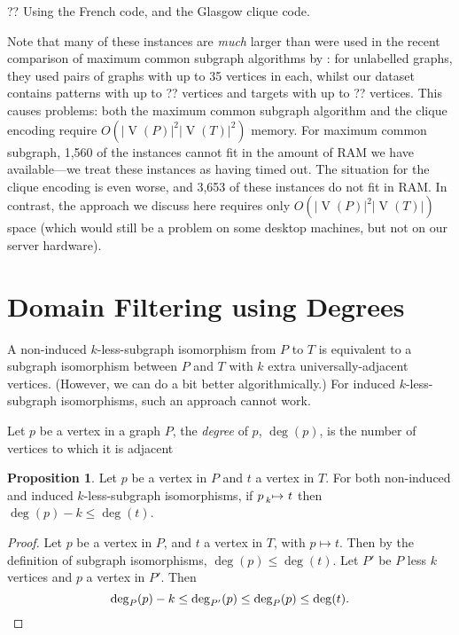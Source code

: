 \documentclass[letterpaper]{article}
\newcommand{\citet}[1]{\citeauthor{#1} \shortcite{#1}}
\theoremstyle{definition}
\newtheorem{proposition}{Proposition}
\newcommand{\lessmap}[1]{\prescript{}{#1}{\mapsto}\ }
\newcommand{\V}{\operatorname{V}}
\begin{document}
?? Using the French code, and the Glasgow clique code.

Note that many of these instances are \emph{much} larger than were used in the recent comparison of
maximum common subgraph algorithms by \citet{DBLP:conf/cp/McCreeshNPS16}: for unlabelled graphs,
they used pairs of graphs with up to 35 vertices in each, whilst our dataset contains patterns with
up to ?? vertices and targets with up to ?? vertices. This causes problems: both the maximum common
subgraph algorithm and the clique encoding require $O(\left|\V(P)\right|^2\left|\V(T)\right|^2)$
memory. For maximum common subgraph, 1,560 of the instances cannot fit in the amount of RAM we have
available---we treat these instances as having timed out. The situation for the clique encoding is
even worse, and 3,653 of these instances do not fit in RAM. In contrast, the approach we discuss
here requires only $O(\left|\V(P)\right|^2\left|\V(T)\right|)$ space (which would still be a problem
on some desktop machines, but not on our server hardware).

\section{Domain Filtering using Degrees}\label{section:degreefiltering}

A non-induced $k$-less-subgraph isomorphism from $P$ to $T$ is equivalent to a subgraph
isomorphism between $P$ and $T$ with $k$ extra universally-adjacent vertices. (However, we can do a
bit better algorithmically.) For induced $k$-less-subgraph isomorphisms, such an approach cannot
work.

Let $p$ be a vertex in a graph $P$, the \emph{degree} of $p$, $\deg(p)$, is the number of vertices
to which it is adjacent

\begin{proposition}
    \label{prop:deg}
    Let $p$ be a vertex in $P$ and $t$ a vertex in $T$. For both non-induced and induced
    $k$-less-subgraph isomorphisms, if $p \lessmap{k} t$ then
    $\deg(p) - k \le \deg(t)$.
\end{proposition}
\begin{proof}
Let $p$ be a vertex in $P$, and $t$ a vertex in $T$, with $p\mapsto t$. Then by the definition of subgraph isomorphisms, $\deg(p) \le \deg(t)$. Let $P'$ be $P$ less $k$ vertices and $p$ a vertex in $P'$. Then
\[
\deg_{P}(p)-k \le \deg_{P'}(p) \le \deg_{P}(p) \le \deg(t). \qedhere
\]
\end{proof}
\end{document}

